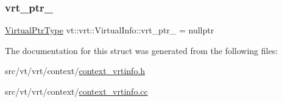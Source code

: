 \subsubsection{\texorpdfstring{vrt\+\_\+ptr\+\_\+}{vrt\_ptr\_}}
{\footnotesize\ttfamily \hyperlink{structvt_1_1vrt_1_1_virtual_info_aede28e76785423dd2685fe4cf54afa21}{Virtual\+Ptr\+Type} vt\+::vrt\+::\+Virtual\+Info\+::vrt\+\_\+ptr\+\_\+ = nullptr\hspace{0.3cm}{\ttfamily [private]}}



The documentation for this struct was generated from the following files\+:\begin{DoxyCompactItemize}
\item 
src/vt/vrt/context/\hyperlink{context__vrtinfo_8h}{context\+\_\+vrtinfo.\+h}\item 
src/vt/vrt/context/\hyperlink{context__vrtinfo_8cc}{context\+\_\+vrtinfo.\+cc}\end{DoxyCompactItemize}
